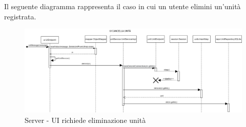Il seguente diagramma rappresenta il caso in cui un utente elimini un'unità registrata.
\begin{figure}[H]
	\centering
	\includegraphics[width=19cm]{img/server_seq3.png}
	\caption{Server - UI richiede eliminazione unità}
\end{figure}